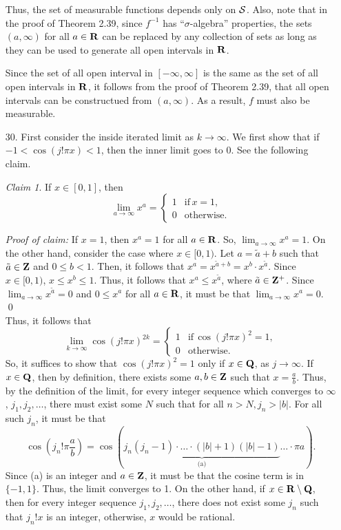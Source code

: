 \documentclass{article}
\theoremstyle{remark}
\newtheorem{claim}{Claim}
\newenvironment{poc}{\textit{Proof of claim:}}{\qed\\}
\begin{document}
\begin{enumerate}[leftmargin=*]
        Thus, the set of measurable functions depends only on $\mathcal{S}$. Also, note
        that in the proof of Theorem 2.39, since $f^{-1}$ has
        ``$\sigma$-algebra'' properties, the sets $(a,\infty)$ for all $a\in \mathbf{R}$
        can be replaced by any collection of sets as long as they can be used to
        generate all open intervals in $\mathbf{R}$. 

        Since the set of all open interval in $[-\infty, \infty]$ is the same as
        the set of all open intervals in $\mathbf{R}$, it follows from the proof of
        Theorem 2.39, that all open intervals can be constructued from
        $(a,\infty)$. As a result, $f$ must also be measurable. 
    \item[30.] First consider the inside iterated limit as $k\to \infty$. We
    first show that if $-1 < \cos(j!\pi x) < 1$, then the inner limit goes to 0.
    See the following claim.
    \begin{claim}
        If $x \in [0,1]$, then 
        \[
            \lim_{a \to \infty} x^a = \begin{cases}1 &\text{if}\,x =1, \\ 0 &\text{otherwise.}\end{cases}
        \]
    \end{claim}
    \begin{poc}
        If $x=1$, then $x^a = 1$ for all $a \in \mathbf{R}$. So, $\lim_{a \to \infty}
        x^a = 1$. On the other hand, consider the case where $x \in [0,1)$. Let
        $a = \tilde a + b$ such that $\tilde a \in \mathbf{Z}$ and $0 \leq b < 1$. Then,
        it follows that $x^a = x^{\tilde a + b} = x^b \cdot x^{\tilde a }$.
        Since $x \in [0,1)$, $x \leq  x^b \leq 1$. Thus, it follows that $x^a
        \leq x^{\tilde a}$, where $\tilde a \in \mathbf{Z}^+$. Since $\lim_{a \to
        \infty} x^{\tilde a} = 0$ and $0 \leq x^a$ for all $a \in \mathbf{R}$, it must
        be that $\lim_{a\to\infty} x^a = 0$. 
    \end{poc}
    Thus, it follows that 
    \[
        \lim_{k\to\infty} \cos(j!\pi x)^{2k} = \begin{cases}1 &\text{if}\, \cos(j!\pi x)^{2} = 1, \\ 0 &\text{otherwise.}\end{cases}
    \]
    So, it suffices to show that $\cos(j!\pi x)^2 = 1$ only if $x \in \mathbf{Q}$, as
    $j\to \infty$. If $x\in \mathbf{Q}$, then by definition, there exists some $a,b\in
    \mathbf{Z}$ such that $x = \frac{a}{b}$. Thus, by the definition of the limit, for
    every integer sequence which converges to $\infty$, $j_1,j_2,\ldots$, there
    must exist some $N$ such that for all $n > N, j_n > |b|$. For all such
    $j_n$, it must be that 
    \[\cos\left(j_n!\pi \frac{a}{b}\right) = \cos(\underbrace{j_n(j_n-1)\cdot
    \ldots \cdot(|b|+1)(|b|-1)}_{\text{(a)}}\ldots \cdot \pi a).\] Since (a) is
    an integer and $a \in \mathbf{Z}$, it must be that the cosine term is in $\{-1,1\}$.
    Thus, the limit converges to 1. On the other hand, if $x \in \mathbf{R} \setminus
    \mathbf{Q}$, then for every integer sequence $j_1,j_2,\ldots$, there does not exist
    some $j_n$ such that $j_n! x$ is an integer, otherwise, $x$ would be
    rational. 
\end{enumerate}
\end{document}

